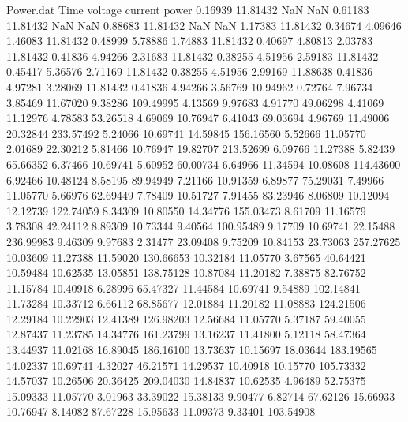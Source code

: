 \begin{filecontents}{Power.dat}
Time voltage current power
   0.16939   11.81432        NaN        NaN
   0.61183   11.81432        NaN        NaN
   0.88683   11.81432        NaN        NaN
   1.17383   11.81432    0.34674    4.09646
   1.46083   11.81432    0.48999    5.78886
   1.74883   11.81432    0.40697    4.80813
   2.03783   11.81432    0.41836    4.94266
   2.31683   11.81432    0.38255    4.51956
   2.59183   11.81432    0.45417    5.36576
   2.71169   11.81432    0.38255    4.51956
   2.99169   11.88638    0.41836    4.97281
   3.28069   11.81432    0.41836    4.94266
   3.56769   10.94962    0.72764    7.96734
   3.85469   11.67020    9.38286  109.49995
   4.13569    9.97683    4.91770   49.06298
   4.41069   11.12976    4.78583   53.26518
   4.69069   10.76947    6.41043   69.03694
   4.96769   11.49006   20.32844  233.57492
   5.24066   10.69741   14.59845  156.16560
   5.52666   11.05770    2.01689   22.30212
   5.81466   10.76947   19.82707  213.52699
   6.09766   11.27388    5.82439   65.66352
   6.37466   10.69741    5.60952   60.00734
   6.64966   11.34594   10.08608  114.43600
   6.92466   10.48124    8.58195   89.94949
   7.21166   10.91359    6.89877   75.29031
   7.49966   11.05770    5.66976   62.69449
   7.78409   10.51727    7.91455   83.23946
   8.06809   10.12094   12.12739  122.74059
   8.34309   10.80550   14.34776  155.03473
   8.61709   11.16579    3.78308   42.24112
   8.89309   10.73344    9.40564  100.95489
   9.17709   10.69741   22.15488  236.99983
   9.46309    9.97683    2.31477   23.09408
   9.75209   10.84153   23.73063  257.27625
  10.03609   11.27388   11.59020  130.66653
  10.32184   11.05770    3.67565   40.64421
  10.59484   10.62535   13.05851  138.75128
  10.87084   11.20182    7.38875   82.76752
  11.15784   10.40918    6.28996   65.47327
  11.44584   10.69741    9.54889  102.14841
  11.73284   10.33712    6.66112   68.85677
  12.01884   11.20182   11.08883  124.21506
  12.29184   10.22903   12.41389  126.98203
  12.56684   11.05770    5.37187   59.40055
  12.87437   11.23785   14.34776  161.23799
  13.16237   11.41800    5.12118   58.47364
  13.44937   11.02168   16.89045  186.16100
  13.73637   10.15697   18.03644  183.19565
  14.02337   10.69741    4.32027   46.21571
  14.29537   10.40918   10.15770  105.73332
  14.57037   10.26506   20.36425  209.04030
  14.84837   10.62535    4.96489   52.75375
  15.09333   11.05770    3.01963   33.39022
  15.38133    9.90477    6.82714   67.62126
  15.66933   10.76947    8.14082   87.67228
  15.95633   11.09373    9.33401  103.54908

\end{filecontents}

